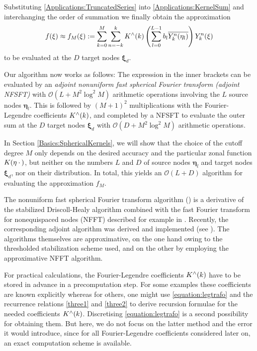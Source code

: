 \documentclass[11pt,a4paper,twoside,bibtotoc]{scrartcl}
\theoremstyle{plain}
\theoremstyle{definition}
\theoremstyle{remark}
\newcommand{\fun}[2]{\ensuremath{#1{\hspace{-0.4ex}}\left(#2\right)}}
\newcommand{\paren}[1]{\ensuremath{\left(#1\right)}}
\newcommand{\bigo}[1]{\ensuremath{\mathcal{O}\paren{#1}}}
\newcommand{\mb}[1]{\mathbf{#1}}
\newcommand{\V}[1]{\mb{#1}}
\numberwithin{equation}{section}
\numberwithin{table}{section}
\numberwithin{figure}{section}
\begin{document}
Substituting \eqref{Applications:TruncatedSeries} into
\eqref{Applications:KernelSum} and interchanging the order of summation we
finally obtain the approximation
\[
  \fun{f}{\V{\xi}} \approx \fun{f_{M}}{\V{\xi}} := \sum_{k=0}^{M} \sum_{n=-k}^k \fun{K^{\wedge}}{k}
  \paren{\sum_{l = 0}^{L-1} b_{l} \overline{\fun{Y_{k}^n}{\V{\eta}_{l}}}}
  \fun{Y_{k}^n}{\V{\xi}}
\]
to be evaluated at the $D$ target nodes $\V{\xi}_{d}$.

Our algorithm now works as follows: The expression in the inner brackets 
can be evaluated by an \emph{adjoint nonuniform fast spherical Fourier 
transform (adjoint NFSFT)} with $\mathcal{O}(L + M^2 \log^2 M)$ arithmetic 
operations involving the $L$ source nodes $\V{\eta}_{l}$. This is followed 
by $(M+1)^2$ multiplications with the Fourier-Legendre coefficients 
$\fun{K^{\wedge}}{k}$, and completed by a NFSFT to evaluate the
outer sum at the $D$ target nodes $\V{\xi}_{d}$ with $\mathcal{O}(D + M^2 \log^2
M)$ arithmetic operations.

In Section \ref{Basics:SphericalKernels}, we will show that the choice 
of the cutoff degree $M$ only depends on the desired accuracy
and the particular zonal function $\fun{K}{\V{\eta} \: \cdot \,}$, but neither
on the numbers $L$ and $D$ of source nodes $\V{\eta}_{l}$ and target nodes 
$\V{\xi}_{d}$, nor on their distribution.
In total, this yields an $\bigo{L + D}$ algorithm for evaluating the 
approximation $f_{M}$.

The nonuniform fast spherical Fourier transform algorithm (\cite{kupo02}) is 
a derivative of the stabilized Driscoll-Healy algorithm \cite{drhe,postta97}
combined with the fast Fourier transform for nonequispaced nodes (NFFT)
described for example in \cite{postta}. Recently, the corresponding adjoint 
algorithm was derived and implemented (see \cite{keiner05}). The algorithms 
themselves are approximative, on the one hand owing to the thresholded stabilization scheme used, and on the other by employing the approximative
NFFT algorithm.

For practical calculations, the Fourier-Legendre coefficients 
$\fun{K^{\wedge}}{k}$ have to be stored in advance in a precomputation step. 
For some examples these coefficients are known explicitly whereas for others, one might use \eqref{equation:legtrafo}
and the recurrence relations \eqref{three1} and \eqref{three2} to derive
recursion formulae for the needed coefficients $\fun{K^{\wedge}}{k}$.
Discretising \eqref{equation:legtrafo} is a second possibility for obtaining them.
But here, we do not focus on the latter method and the error it would introduce, since for all Fourier-Legendre coefficients considered later on, an exact computation scheme is available.
\end{document}

